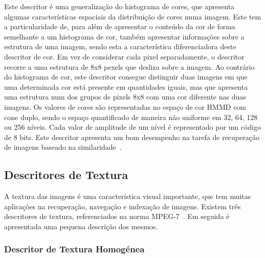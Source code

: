 Este descritor é uma generalização do histograma de cores, que apresenta algumas características espaciais da distribuição de cores numa imagem. Este tem a particularidade de, para além de apresentar o conteúdo da cor de forma semelhante a um histograma de cor, também apresentar informações sobre a estrutura de uma imagem, sendo esta a característica diferenciadora deste descritor de cor. Em vez de considerar cada pixel separadamente, o descritor recorre a uma estrutura de 8x8 pexels que desliza sobre a imagem. Ao contrário do histograma de cor, este descritor consegue distinguir duas imagens em que uma determinada cor está presente em quantidades iguais, mas que apresenta uma estrutura num dos grupos de pixels 8x8 com uma cor diferente nas duas imagens. Os valores de cores são representadas no espaço de cor HMMD com cone duplo, sendo o espaço quantificado de maneira não uniforme em 32, 64, 128 ou 256 níveis. 
Cada valor de amplitude de um nível é representado por um código de 8 bits. Este descritor apresenta um bom desempenho na tarefa de recuperação de imagens baseado na similaridade~\cite{Modi2008}.

%

\subsection{Descritores de Textura}

A textura das imagens é uma característica visual importante, que tem muitas aplicações na recuperação, navegação e indexação de imagens. Existem três descritores de textura, referenciados na norma MPEG-7~\cite{Wu2001}. Em seguida é apresentada uma pequena descrição dos mesmos.

\subsubsection{Descritor de Textura Homogénea}

